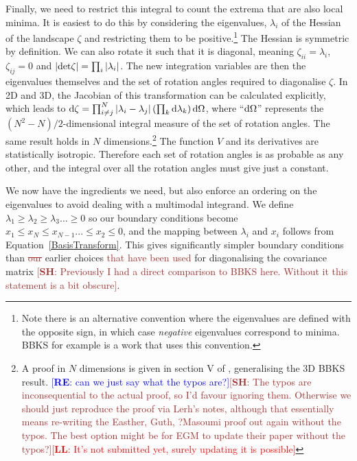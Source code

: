 \documentclass[12pt]{article}
\newcommand{\re}[1]{\textcolor{blue}{[{\bf RE}: #1]}}
\newcommand{\lfl}[1]{\textcolor{red}{[{\bf LL}: #1]}}
\newcommand{\SH}[1]{\textcolor{brown}{[{\bf SH}: #1]}}
\newcommand{\sh}[1]{\textcolor{brown}{#1}}
\begin{document}
Finally, we need to restrict this integral to count the extrema that are also local minima. It is easiest to do this by considering the eigenvalues, $\lambda_i$ of the Hessian of the landscape $\zeta$ and restricting them to be positive.\footnote{Note there is an alternative convention where the eigenvalues are defined with the opposite sign, in which case \emph{negative} eigenvalues correspond to minima. BBKS for example is a work that uses this convention.}  The Hessian is symmetric by definition. We can also rotate it such that it is diagonal, meaning  $\zeta_{ii}=\lambda_i$, $\zeta_{ij}=0$ and $|{\rm det} \zeta| = \prod_i |\lambda_i|$. The new integration variables are then the eigenvalues themselves and the set of rotation angles required to diagonalise $\zeta$.  In 2D and 3D, the Jacobian of this transformation can be calculated explicitly, which leads to  ${\rm d} \zeta = \prod_{i \neq j}^N |\lambda_i - \lambda_j|\left(\prod_k {\rm d}\lambda_k\right) {\rm d} \Omega$, where ``${\rm d}\Omega$'' represents the $(N^2-N)/2$-dimensional integral measure of the set of rotation angles. The same result holds in $N$ dimensions.\footnote{A proof in $N$ dimensions is given in section V of \cite{Easther2016}, generalising the 3D  BBKS result. \re{can we just say what the typos are?}\SH{The typos are inconsequential to the actual proof, so I'd favour ignoring them. Otherwise we should just reproduce the proof via Lerh's notes, although that essentially means re-writing the Easther, Guth, ?Masoumi proof out again without the typos. The best option might be for EGM to update their paper without the typos?}\lfl{It's not submitted yet, surely updating it is possible}} The function $V$ and its derivatives are statistically isotropic. Therefore each set of rotation angles is as probable as any other, and the integral over all the rotation angles must give just a constant.

We now have  the ingredients we  need, but  also enforce an ordering on the eigenvalues to avoid dealing with a multimodal integrand.  We define  $\lambda_1 \geq \lambda_2 \geq \lambda_3 \ldots \geq 0$ so our boundary conditions become $x_1\leq x_N\leq x_{N-1} ... \leq x_2 \leq 0$, and the mapping between $\lambda_i$ and $x_i$  follows from Equation~\ref{BasisTransform}. This gives significantly simpler boundary conditions than \sh{\sout{our}} earlier choices \sh{that have been used} for diagonalising the covariance matrix \SH{Previously I had a direct comparison to BBKS here. Without it this statement is a bit obscure}.
\end{document}
